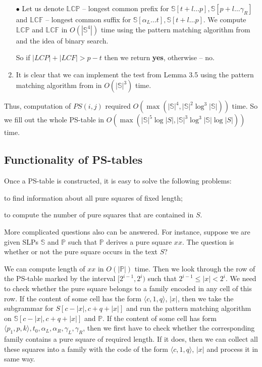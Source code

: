 \documentclass[11pt]{article}
\begin{document}
\begin{enumerate}
$\bullet$ Let us denote $\mathbb{LCP}$ -- longest common prefix for $\mathbb{S}[t + l \dots p], \mathbb{S}[p +
l\dots \gamma_R]$ and $\mathbb{LCF}$ -- longest common suffix for $\mathbb{S}[\alpha_L\dots t], \mathbb{S}[t + l
\dots p]$. We compute $\mathbb{LCP}$ and $\mathbb{LCF}$ in $O(|\mathbb{S}^4|)$ time using the pattern matching
algorithm from \cite{15} and the idea of binary search.

So if $|LCP| + |LCF| > p - t$ then we return {\bf yes}, otherwise -- no.

\item
It is clear that we can implement the test from Lemma 3.5 using the pattern matching algorithm from \cite{15} in
$O(|\mathbb{S}|^3)$ time.
\end{enumerate}

Thus, computation of $PS(i, j)$ required $O(\max(|\mathbb{S}|^4, |\mathbb{S}|^2\log^3|\mathbb{S}|))$ time. So we
fill out the whole PS-table in $O(\max(|\mathbb{S}|^5\log|S|, |\mathbb{S}|^3\log^3|\mathbb{S}|\log|S|))$ time.

\ComputingPeriodContinuation{}

\subsection{Functionality of PS-tables}

Once a PS-table is constructed, it is easy to solve the following problems:

\begin{itemize}
\begin{item}
to find information about all pure squares of fixed length;
\end{item}
\begin{item}
to compute the number of pure squares that are contained in $S$.
\end{item}
\end{itemize}

More complicated questions also can be answered. For instance, suppose we are given SLPs $\mathbb{S}$ and
$\mathbb{P}$ such that $\mathbb{P}$ derives a pure square $xx$. The question is whether or not the pure square
occurs in the text $S$?

We can compute length of $xx$ in $O(|\mathbb{P}|)$ time. Then we look through the row of the PS-table marked by
the interval $[2^{i-1}, 2^i)$ such that $2^{i-1}\le |x|< 2^i$. We need to check whether the pure square belongs to
a family encoded in any cell of this row. If the content of some cell has the form $\langle c, 1, q\rangle$,
$|x|$, then we take the subgrammar for $S[c-|x|, c+q+|x|]$ and run the pattern matching algorithm on
$\mathbb{S}[c-|x|, c+q+|x|]$ and $\mathbb{P}$. If the content of some cell has form $\langle p_1, p,
k\rangle,t_0,\alpha_L, \alpha_R, \gamma_L, \gamma_R$, then we first have to check whether the corresponding family
contains a pure square of required length. If it does, then we can collect all these squares into a family with
the code of the form $\langle c, 1, q\rangle$, $|x|$ and process it in same way.
\end{document}
